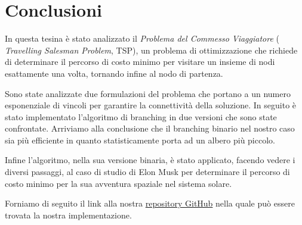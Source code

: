 \chapter{Conclusioni}


In questa tesina è stato analizzato il \textit{Problema del Commesso Viaggiatore} ( \textit{Travelling Salesman Problem}, TSP), un problema di ottimizzazione che richiede di determinare il percorso di costo minimo per visitare un insieme di nodi esattamente una volta, tornando infine al nodo di partenza. 

Sono state analizzate due formulazioni del problema che portano a un numero esponenziale di vincoli per garantire la connettività della soluzione. In seguito è stato implementato l’algoritmo di branching in due versioni che sono state confrontate. Arriviamo alla conclusione che il branching binario nel nostro caso sia più efficiente in quanto statisticamente porta ad un albero più piccolo.

Infine l’algoritmo, nella sua versione binaria, è stato applicato, facendo vedere i diversi passaggi, al caso di studio di Elon Musk per determinare il percorso di costo minimo per la sua avventura spaziale nel sistema solare.

Forniamo di seguito il link alla nostra  \href{http://www.overleaf.com}{repository GitHub} nella quale può essere trovata la nostra implementazione.
